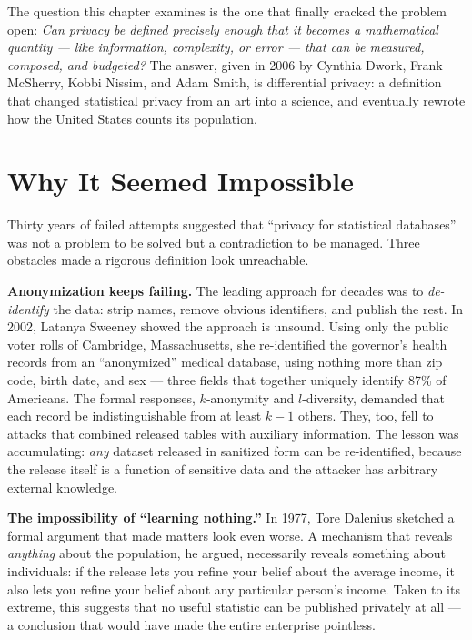 The question this chapter examines is the one that finally cracked the problem open: \emph{Can privacy be defined precisely enough that it becomes a mathematical quantity --- like information, complexity, or error --- that can be measured, composed, and budgeted?} The answer, given in 2006 by Cynthia Dwork, Frank McSherry, Kobbi Nissim, and Adam Smith, is differential privacy: a definition that changed statistical privacy from an art into a science, and eventually rewrote how the United States counts its population. 

\section{Why It Seemed Impossible}
\label{sec:dp:impossible}

Thirty years of failed attempts suggested that ``privacy for statistical databases'' was not a problem to be solved but a contradiction to be managed. Three obstacles made a rigorous definition look unreachable.

\textbf{Anonymization keeps failing.} The leading approach for decades was to \emph{de-identify} the data: strip names, remove obvious identifiers, and publish the rest. In 2002, Latanya Sweeney showed the approach is unsound. Using only the public voter rolls of Cambridge, Massachusetts, she re-identified the governor's health records from an ``anonymized'' medical database, using nothing more than zip code, birth date, and sex --- three fields that together uniquely identify 87\% of Americans. \cite{sweeney2002} The formal responses, $k$-anonymity and $l$-diversity, demanded that each record be indistinguishable from at least $k-1$ others. They, too, fell to attacks that combined released tables with auxiliary information. The lesson was accumulating: \emph{any} dataset released in sanitized form can be re-identified, because the release itself is a function of sensitive data and the attacker has arbitrary external knowledge.  

\textbf{The impossibility of ``learning nothing.''} In 1977, Tore Dalenius sketched a formal argument that made matters look even worse. A mechanism that reveals \emph{anything} about the population, he argued, necessarily reveals something about individuals: if the release lets you refine your belief about the average income, it also lets you refine your belief about any particular person's income. Taken to its extreme, this suggests that no useful statistic can be published privately at all --- a conclusion that would have made the entire enterprise pointless. 

